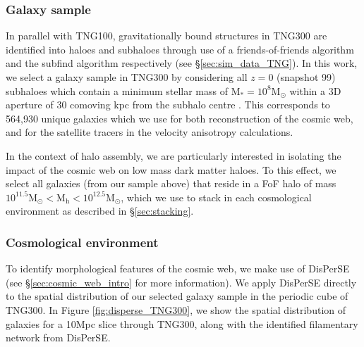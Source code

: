 \subsubsection{Galaxy sample} \label{sec:gal_samp}
In parallel with TNG100, gravitationally bound structures in TNG300 are identified into haloes and subhaloes through use of a friends-of-friends algorithm \citep{davis85} and the subfind algorithm \citep{springel01} respectively (see \S\ref{sec:sim_data_TNG}). In this work, we select a galaxy sample in TNG300 by considering all $z=0$ (snapshot 99) subhaloes which contain a minimum stellar mass of $\mathrm{M_{\ast} = 10^{8} M_{\odot}}$ within a 3D aperture of 30 comoving kpc from the subhalo centre \citep[as defined in;][]{pillepich18b}. This corresponds to 564,930 unique galaxies which we use for both reconstruction of the cosmic web, and for the satellite tracers in the velocity anisotropy calculations.

In the context of halo assembly, we are particularly interested in isolating the impact of the cosmic web on low mass dark matter haloes. To this effect, we select all galaxies (from our sample above) that reside in a FoF halo of mass $\mathrm{10^{11.5} M_{\odot} < M_{h} < 10^{12.5} M_{\odot}}$, which we use to stack in each cosmological environment as described in \S\ref{sec:stacking}. 

\subsubsection{Cosmological environment}
To identify morphological features of the cosmic web, we make use of DisPerSE (see \S\ref{sec:cosmic_web_intro} for more information). We apply DisPerSE directly to the spatial distribution of our selected galaxy sample in the periodic cube of TNG300. In Figure \ref{fig:disperse_TNG300}, we show the spatial distribution of galaxies for a 10Mpc slice through TNG300, along with the identified filamentary network from DisPerSE.

